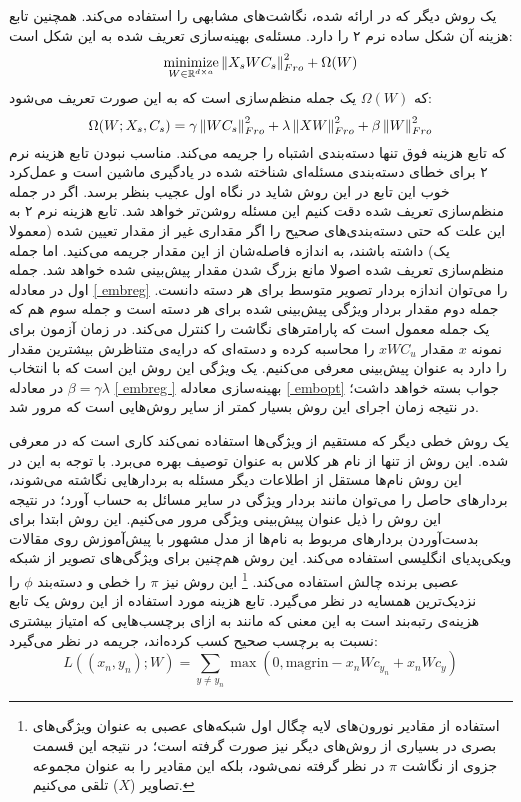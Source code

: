 یک روش دیگر که در \cite{ emb15} ارائه شده، نگاشت‌های مشابهی را استفاده می‌کند. همچنین تابع هزینه آن شکل ساده نرم ۲ را دارد. مسئله‌ی بهینه‌سازی تعریف شده به این شکل است:
\begin{equation} 
\operatorname*{minimize}_{W \in \mathbb{R}^{d \times a}} \left \lVert X_s WC_s \right \rVert_{Fro}^2 + \Omega(W) \label{embopt}
\end{equation}
که $\Omega(W)$ یک جمله منظم‌سازی است که به این صورت تعریف می‌شود:
\begin{equation} \label{embreg}
 \Omega(W;X_s, C_s) = \gamma \left \lVert WC_s \right \rVert_{Fro}^2 + \lambda \left \lVert XW \right \rVert_{Fro}^2 + \beta \left \lVert W \right \rVert_{Fro}^2 
\end{equation}
که تابع هزینه فوق تنها دسته‌بندی اشتباه را جریمه می‌کند. مناسب نبودن تابع هزینه نرم ۲ برای خطای دسته‌بندی مسئله‌ای شناخته شده در یادگیری ماشین است و عمل‌کرد خوب این تابع در این روش شاید در نگاه اول عجیب بنظر برسد. اگر در جمله منظم‌سازی تعریف شده دقت کنیم این مسئله روشن‌تر خواهد شد. تابع هزینه نرم ۲ به این علت که حتی دسته‌بندی‌های صحیح را اگر مقداری غیر از مقدار تعیین شده (معمولا یک) داشته باشند، به اندازه فاصله‌شان از این مقدار جریمه می‌کنید. اما جمله منظم‌سازی تعریف شده اصولا مانع بزرگ شدن مقدار پیش‌بینی شده خواهد شد. جمله اول در معادله \eqref{ embreg} را می‌توان اندازه بردار تصویر متوسط برای هر دسته دانست. جمله دوم مقدار بردار ویژگی پیش‌بینی شده برای هر دسته است و جمله سوم هم که یک جمله معمول است که پارامترهای نگاشت را کنترل می‌کند. در زمان آزمون برای نمونه $x$ مقدار $xWC_u$ را محاسبه کرده و دسته‌ای که درایه‌ی متناظرش بیشترین مقدار را دارد به عنوان پیش‌بینی معرفی می‌کنیم. یک ویژگی این روش این است که با انتخاب $ \beta = \gamma \lambda$ در معادله \eqref{ embreg } بهینه‌سازی معادله \eqref{ embopt} جواب بسته خواهد داشت؛ در نتیجه زمان اجرای این روش بسیار کمتر از سایر روش‌هایی است که مرور شد. 

یک روش خطی دیگر که مستقیم از ویژگی‌ها استفاده نمی‌کند کاری است که در \cite{ devise} معرفی شده. این روش از تنها از نام هر کلاس به عنوان توصیف بهره می‌برد. با توجه به این در این روش نام‌ها مستقل از اطلاعات دیگر مسئله به بردارهایی نگاشته می‌شوند، بردارهای حاصل را می‌توان مانند بردار ویژگی در سایر مسائل به حساب آورد؛ در نتیجه این روش را ذیل عنوان پیش‌بینی ویژگی مرور می‌کنیم. این روش ابتدا برای بدست‌آوردن بردارهای مربوط به نام‌ها از مدل مشهور 
  \cite{ word2vec} 
با پیش‌آموزش روی مقالات ویکی‌پدیای انگلیسی استفاده می‌کند. این روش هم‌چنین برای ویژگی‌های تصویر از شبکه عصبی برنده چالش
استفاده می‌کند. \footnote{ استفاده از مقادیر نورون‌های لایه چگال اول شبکه‌های عصبی به عنوان ویژگی‌های بصری در بسیاری از روش‌های دیگر نیز صورت گرفته است؛ در نتیجه این قسمت جزوی از نگاشت $\pi$ در نظر گرفته نمی‌شود، بلکه این مقادیر را به عنوان مجموعه تصاویر ($X$) تلقی می‌کنیم. }
این روش نیز $\pi$ را خطی و دسته‌بند $\phi$ را نزدیک‌ترین همسایه در نظر می‌گیرد. تابع هزینه مورد استفاده از این روش یک تابع هزینه‌ی رتبه‌بند است به این معنی که مانند  \cite{ akata13} به ازای  برچسب‌هایی که امتیاز بیشتری نسبت به برچسب صحیح کسب کرده‌اند، جریمه در نظر می‌گیرد:
\begin{equation}
 L((x_n, y_n);W) = \sum_{y\neq y_n} \max(0, \text{magrin} - x_nWc_{y_n} + x_nWc_y) 
\end{equation}

